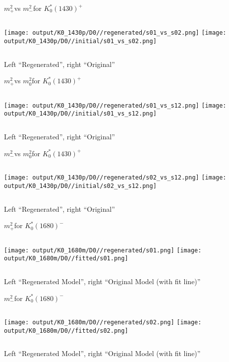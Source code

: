 \documentclass{beamer}
\newcommand{\MP}{\ensuremath{m^2_+}}
\newcommand{\MM}{\ensuremath{m^2_-}}
\newcommand{\MZ}{\ensuremath{m^2_0}}
\begin{document}
\begin{frame}{\MP vs \MM for $K_0^*(1430)^+$}
\begin{columns}[t]
\centering
\texttt{[image: output/K0\_1430p/D0//regenerated/s01\_vs\_s02.png]}
\centering
\texttt{[image: output/K0\_1430p/D0//initial/s01\_vs\_s02.png]}
\end{columns}
    \centering
    Left ``Regenerated'', right ``Original''
\end{frame} 


\begin{frame}{\MP vs \MZ for $K_0^*(1430)^+$}
\begin{columns}[t]
\centering
\texttt{[image: output/K0\_1430p/D0//regenerated/s01\_vs\_s12.png]}
\centering
\texttt{[image: output/K0\_1430p/D0//initial/s01\_vs\_s12.png]}
\end{columns}
    \centering
    Left ``Regenerated'', right ``Original''
\end{frame} 


\begin{frame}{\MM vs \MZ for $K_0^*(1430)^+$}
\begin{columns}[t]
\centering
\texttt{[image: output/K0\_1430p/D0//regenerated/s02\_vs\_s12.png]}
\centering
\texttt{[image: output/K0\_1430p/D0//initial/s02\_vs\_s12.png]}
\end{columns}
    \centering
    Left ``Regenerated'', right ``Original''
\end{frame} 

\begin{frame}{\MP for $K_0^*(1680)^-$}
\begin{columns}[t]
\centering
\texttt{[image: output/K0\_1680m/D0//regenerated/s01.png]}
\centering
\texttt{[image: output/K0\_1680m/D0//fitted/s01.png]}
\end{columns}
    \centering
    Left ``Regenerated Model'', right ``Original Model (with fit line)''
\end{frame}                   

\begin{frame}{\MM for $K_0^*(1680)^-$}
\begin{columns}[t]
\centering
\texttt{[image: output/K0\_1680m/D0//regenerated/s02.png]}
\centering
\texttt{[image: output/K0\_1680m/D0//fitted/s02.png]}
\end{columns}
    \centering
    Left ``Regenerated Model'', right ``Original Model (with fit line)''
\end{frame}                   
\end{document}
